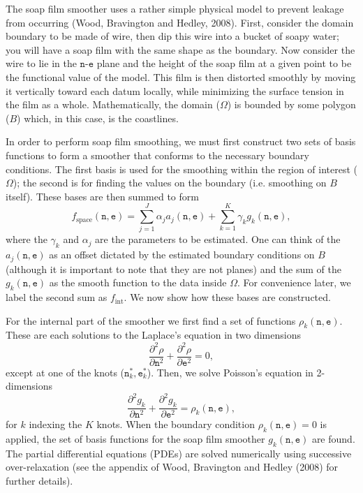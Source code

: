 The soap film smoother uses a rather simple physical model to prevent leakage from occurring (Wood, Bravington and Hedley, 2008). First, consider the domain boundary to be made of wire, then dip this wire into a bucket of soapy water; you will have a soap film with the same shape as the boundary. Now consider the wire to lie in the $\texttt{n}$-$\texttt{e}$ plane and the height of the soap film at a given point to be the functional value of the model. This film is then distorted smoothly by moving it vertically toward each datum locally, while minimizing the surface tension in the film as a whole. Mathematically, the domain ($\Omega$) is bounded by some polygon ($B$) which, in this case, is the coastlines.

In order to perform soap film smoothing, we must first construct two sets of basis functions to form a smoother that conforms to the necessary boundary conditions. The first basis is used for the smoothing within the region of interest ($\Omega$); the second is for finding the values on the boundary (i.e. smoothing on $B$ itself). These bases are then summed to form
$$
f_\text{space}(\texttt{n},\texttt{e})=\sum_{j=1}^J \alpha_j a_j(\texttt{n},\texttt{e}) + \sum_{k=1}^K \gamma_k g_k(\texttt{n},\texttt{e}),
$$
where the $\gamma_k$ and $\alpha_j$ are the parameters to be estimated. One can think of the $a_j(\texttt{n},\texttt{e})$ as an offset dictated by the estimated boundary conditions on $B$ (although it is important to note that they are not planes) and the sum of the $g_k(\texttt{n},\texttt{e})$ as the smooth function to the data inside $\Omega$. For convenience later, we label the second sum as $f_\text{int}$. We now show how these bases are constructed.

For the internal part of the smoother we first find a set of functions $\rho_k(\texttt{n},\texttt{e})$. These are each solutions to the Laplace's equation in two dimensions
$$
\frac{\partial^2\rho}{\partial \texttt{n}^2} + \frac{\partial^2\rho}{\partial \texttt{e}^2} = 0,
$$
except at one of the knots ($\texttt{n}^*_k,\texttt{e}^*_k$). Then, we solve Poisson's equation in 2-dimensions
\begin{equation}
\frac{\partial^2 g_k}{\partial \texttt{n}^2} + \frac{\partial^2 g_k}{\partial \texttt{e}^2} = \rho_k(\texttt{n},\texttt{e}),
\label{soap-poisson}
\end{equation}
for $k$ indexing the $K$ knots. When the boundary condition $\rho_k(\texttt{n},\texttt{e})=0$ is applied, the set of basis functions for the soap film smoother $g_k(\texttt{n},\texttt{e})$ are found.  The partial differential equations (PDEs) are solved numerically using successive over-relaxation (see the appendix of Wood, Bravington and Hedley (2008) for further details).

